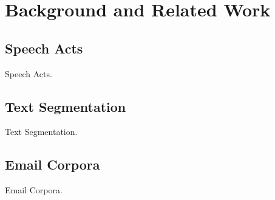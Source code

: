 
\chapter{Background and Related Work}

\section{Speech Acts}

Speech Acts.

\section{Text Segmentation}

Text Segmentation.

\section{Email Corpora}

Email Corpora.